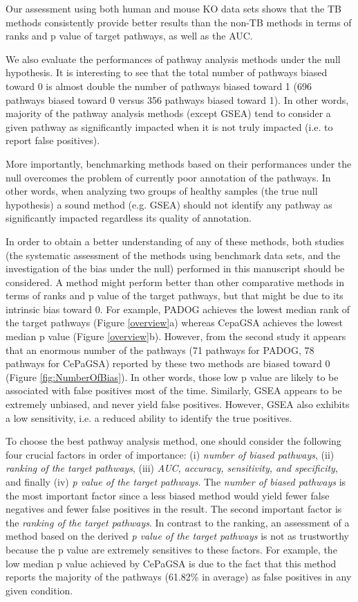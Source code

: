 Our assessment using both human and mouse KO data sets shows that the TB methods consistently provide better results than the non-TB methods in terms of ranks and p value of target pathways, as well as the AUC. 

We also evaluate the performances of pathway analysis methods under the null hypothesis.
It is interesting to see that the total number of pathways biased toward 0 is almost double the number of pathways biased toward 1 (696 pathways biased toward 0 versus 356 pathways biased toward 1).
In other words, majority of the pathway analysis methods (except GSEA) tend to consider a given pathway as significantly impacted when it is not truly impacted (i.e. to report false positives). 


More importantly, benchmarking methods based on their performances under the null overcomes the problem of currently poor annotation of the pathways.
In other words, when analyzing two groups of healthy samples (the true null hypothesis) a sound method (e.g. GSEA) should not identify any pathway as significantly impacted regardless its quality of annotation. 

In order to obtain a better understanding of any of these  methods, both studies (the systematic assessment of the methods using benchmark data sets, and the investigation of the bias under the null) performed in this manuscript should be considered.
A method might perform better than other comparative methods in terms of ranks and p value of the target pathways, but that might be due to its intrinsic bias toward 0. 
For example, PADOG achieves the lowest median rank of the target pathways (Figure \ref{overview}a) whereas CepaGSA achieves the lowest median p value (Figure \ref{overview}b).
However, from the second study it appears that an enormous number of the pathways (71 pathways for PADOG, 78 pathways for CePaGSA) reported by these two methods are biased toward 0 (Figure \ref{fig:NumberOfBias}). 
In other words, those low p value are likely to be associated with false positives most of the time. Similarly, GSEA appears to be extremely unbiased, and never yield false positives. However, GSEA  also exhibits a low sensitivity, i.e. a reduced ability to identify the true positives. 

To choose the best pathway analysis method, one should consider the  following four crucial factors in order of importance: (i) \textit{number of biased pathways}, (ii) \textit{ranking of the target pathways}, (iii) \textit{AUC, accuracy, sensitivity, and specificity}, and finally (iv) \textit{p value of the target pathways}. 
The \textit{number of biased pathways} is the most important factor since a less biased method would yield fewer false negatives and fewer false positives in the result.
The second important factor is the \textit{ranking of the target pathways}.
In contrast to the ranking, an assessment of a method based on the derived \textit{p value of the target pathways} is not as trustworthy because the p value are extremely sensitives to these factors. 
For example, the low median p value achieved by CePaGSA is due to the fact that this method reports the majority of the pathways (61.82\% in average) as false positives in any given condition. 

